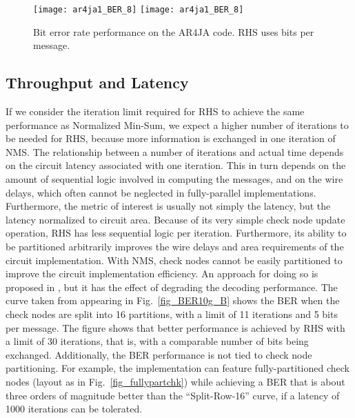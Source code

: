 \documentclass[12pt,journal,twoside,draftcls,onecolumn]{IEEEtran}
\begin{document}
\begin{figure}[tbp]
\begin{center}
\ifCLASSOPTIONdraftcls
	\texttt{[image: ar4ja1\_BER\_8]}
\else
	\texttt{[image: ar4ja1\_BER\_8]}
\fi
\caption{Bit error rate performance on the AR4JA code. RHS uses  bits per message.}
\label{fig_BERar4ja}
\end{center}
\end{figure}


\subsection{Throughput and Latency}
\label{sect_results::practical}

If we consider the iteration limit required for RHS to achieve the same performance as Normalized Min-Sum, we expect a higher number of iterations to be needed for RHS, because more information is exchanged in one iteration of NMS. 
The relationship between a number of iterations and actual time depends on the circuit latency associated with one iteration. This in turn depends on the amount of sequential logic involved in computing the messages, and on the wire delays, which often cannot be neglected in fully-parallel implementations. Furthermore, the metric of interest is usually not simply the latency, but the latency normalized to circuit area.
Because of its very simple check node update operation, RHS has less sequential logic per iteration. Furthermore, its ability to be partitioned arbitrarily improves the wire delays and area requirements of the circuit implementation.
With NMS, check nodes cannot be easily partitioned to improve the circuit implementation efficiency. An approach for doing so is proposed in \cite{mohsenin:2010}, but it has the effect of degrading the decoding performance. The curve taken from \cite{mohsenin:2010} appearing in Fig.~\ref{fig_BER10g_B} shows the BER when the check nodes are split into 16 partitions, with a limit of 11 iterations and 5 bits per message. The figure shows that better performance is achieved by RHS with a limit of 30 iterations, that is, with a comparable number of bits being exchanged.
Additionally, the BER performance is not tied to check node partitioning. For example, the implementation can feature fully-partitioned check nodes (layout as in Fig.~\ref{fig_fullypartchk}) while achieving a BER that is about three orders of magnitude better than the ``Split-Row-16'' curve, if a latency of 1000 iterations can be tolerated.
\end{document}
